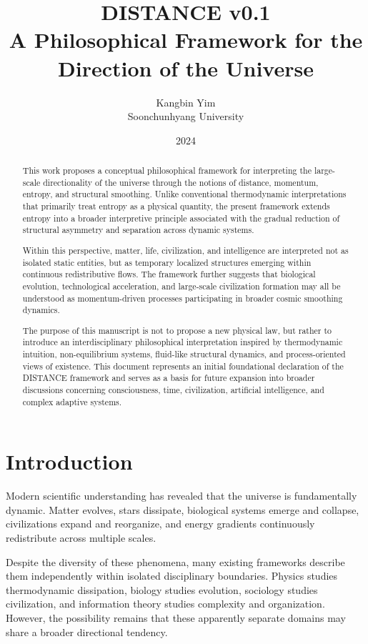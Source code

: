 \documentclass[11pt]{article}
\title{DISTANCE v0.1\\[0.5em]
\large A Philosophical Framework for the Direction of the Universe}
\author{Kangbin Yim\\Soonchunhyang University}
\date{2024}
\begin{document}
\maketitle

\begin{abstract}
This work proposes a conceptual philosophical framework for interpreting the large-scale directionality of the universe through the notions of distance, momentum, entropy, and structural smoothing. Unlike conventional thermodynamic interpretations that primarily treat entropy as a physical quantity, the present framework extends entropy into a broader interpretive principle associated with the gradual reduction of structural asymmetry and separation across dynamic systems.

Within this perspective, matter, life, civilization, and intelligence are interpreted not as isolated static entities, but as temporary localized structures emerging within continuous redistributive flows. The framework further suggests that biological evolution, technological acceleration, and large-scale civilization formation may all be understood as momentum-driven processes participating in broader cosmic smoothing dynamics.

The purpose of this manuscript is not to propose a new physical law, but rather to introduce an interdisciplinary philosophical interpretation inspired by thermodynamic intuition, non-equilibrium systems, fluid-like structural dynamics, and process-oriented views of existence. This document represents an initial foundational declaration of the DISTANCE framework and serves as a basis for future expansion into broader discussions concerning consciousness, time, civilization, artificial intelligence, and complex adaptive systems.
\end{abstract}

\section{Introduction}

Modern scientific understanding has revealed that the universe is fundamentally dynamic. Matter evolves, stars dissipate, biological systems emerge and collapse, civilizations expand and reorganize, and energy gradients continuously redistribute across multiple scales.

Despite the diversity of these phenomena, many existing frameworks describe them independently within isolated disciplinary boundaries. Physics studies thermodynamic dissipation, biology studies evolution, sociology studies civilization, and information theory studies complexity and organization. However, the possibility remains that these apparently separate domains may share a broader directional tendency.
\end{document}
